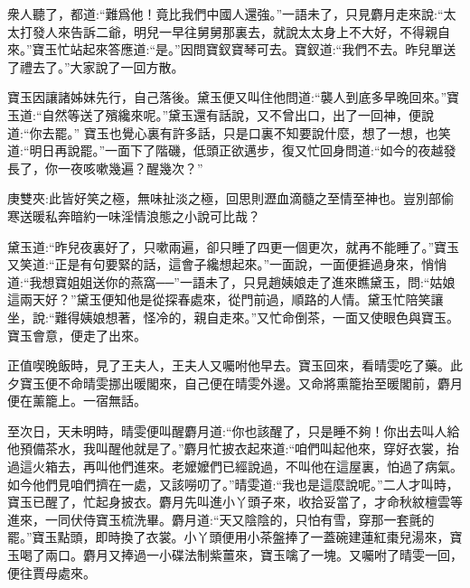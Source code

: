 \begin{parag}
    衆人聽了，都道:“難爲他！竟比我們中國人還強。”一語未了，只見麝月走來說:“太太打發人來告訴二爺，明兒一早往舅舅那裏去，就說太太身上不大好，不得親自來。”寶玉忙站起來答應道:“是。”因問寶釵寶琴可去。寶釵道:“我們不去。昨兒單送了禮去了。”大家說了一回方散。
\end{parag}


\begin{parag}
    寶玉因讓諸姊妹先行，自己落後。黛玉便又叫住他問道:“襲人到底多早晚回來。”寶玉道:“自然等送了殯纔來呢。”黛玉還有話說，又不曾出口，出了一回神，便說道:“你去罷。” 寶玉也覺心裏有許多話，只是口裏不知要說什麼，想了一想，也笑道:“明日再說罷。”一面下了階磯，低頭正欲邁步，復又忙回身問道:“如今的夜越發長了，你一夜咳嗽幾遍？醒幾次？”\begin{note}庚雙夾:此皆好笑之極，無味扯淡之極，回思則瀝血滴髓之至情至神也。豈別部偷寒送暖私奔暗約一味淫情浪態之小說可比哉？\end{note}黛玉道:“昨兒夜裏好了，只嗽兩遍，卻只睡了四更一個更次，就再不能睡了。”寶玉又笑道:“正是有句要緊的話，這會子纔想起來。”一面說，一面便捱過身來，悄悄道:“我想寶姐姐送你的燕窩──”一語未了，只見趙姨娘走了進來瞧黛玉，問:“姑娘這兩天好？”黛玉便知他是從探春處來，從門前過，順路的人情。黛玉忙陪笑讓坐，說:“難得姨娘想著，怪冷的，親自走來。”又忙命倒茶，一面又使眼色與寶玉。寶玉會意，便走了出來。
\end{parag}


\begin{parag}
    正值喫晚飯時，見了王夫人，王夫人又囑咐他早去。寶玉回來，看晴雯吃了藥。此夕寶玉便不命晴雯挪出暖閣來，自己便在晴雯外邊。又命將熏籠抬至暖閣前，麝月便在薰籠上。一宿無話。
\end{parag}


\begin{parag}
    至次日，天未明時，晴雯便叫醒麝月道:“你也該醒了，只是睡不夠！你出去叫人給他預備茶水，我叫醒他就是了。”麝月忙披衣起來道:“咱們叫起他來，穿好衣裳，抬過這火箱去，再叫他們進來。老嬤嬤們已經說過，不叫他在這屋裏，怕過了病氣。如今他們見咱們擠在一處，又該嘮叨了。”晴雯道:“我也是這麼說呢。”二人才叫時，寶玉已醒了，忙起身披衣。麝月先叫進小丫頭子來，收拾妥當了，才命秋紋檀雲等進來，一同伏侍寶玉梳洗畢。麝月道:“天又陰陰的，只怕有雪，穿那一套氈的罷。”寶玉點頭，即時換了衣裳。小丫頭便用小茶盤捧了一蓋碗建蓮紅棗兒湯來，寶玉喝了兩口。麝月又捧過一小碟法制紫薑來，寶玉噙了一塊。又囑咐了晴雯一回，便往賈母處來。
\end{parag}


